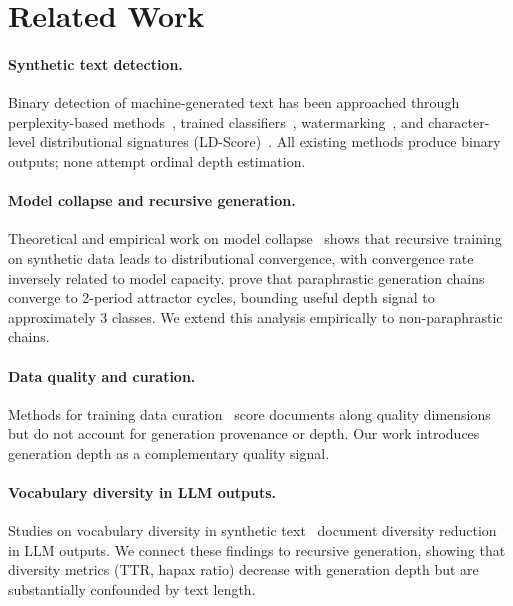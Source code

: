 \documentclass[11pt]{article}
\begin{document}
\section{Related Work}
\label{sec:related}

\paragraph{Synthetic text detection.}
Binary detection of machine-generated text has been approached through perplexity-based methods~\citep{gehrmann2019gltr,mitchell2023detectgpt,bao2024fastdetectgpt,hans2024binoculars}, trained classifiers~\citep{solaiman2019release,uchendu2020authorship}, watermarking~\citep{kirchenbauer2023watermark}, and character-level distributional signatures (LD-Score)~\citep{tulchinskii2024ldscore}.
All existing methods produce binary outputs; none attempt ordinal depth estimation.

\paragraph{Model collapse and recursive generation.}
Theoretical and empirical work on model collapse~\citep{alemohammad2024selfconsuming,shumailov2024curse,dohmatob2024model,gerstgrasser2024model} shows that recursive training on synthetic data leads to distributional convergence, with convergence rate inversely related to model capacity.
\citet{briesch2023attractor} prove that paraphrastic generation chains converge to 2-period attractor cycles, bounding useful depth signal to approximately 3 classes.
We extend this analysis empirically to non-paraphrastic chains.

\paragraph{Data quality and curation.}
Methods for training data curation~\citep{xie2023dsir,wettig2024qurating,wenzek2020ccnet} score documents along quality dimensions but do not account for generation provenance or depth.
Our work introduces generation depth as a complementary quality signal.

\paragraph{Vocabulary diversity in LLM outputs.}
Studies on vocabulary diversity in synthetic text~\citep{guo2024curious,padmakumar2024does,holtzman2020curious} document diversity reduction in LLM outputs.
We connect these findings to recursive generation, showing that diversity metrics (TTR, hapax ratio) decrease with generation depth but are substantially confounded by text length.
\end{document}
